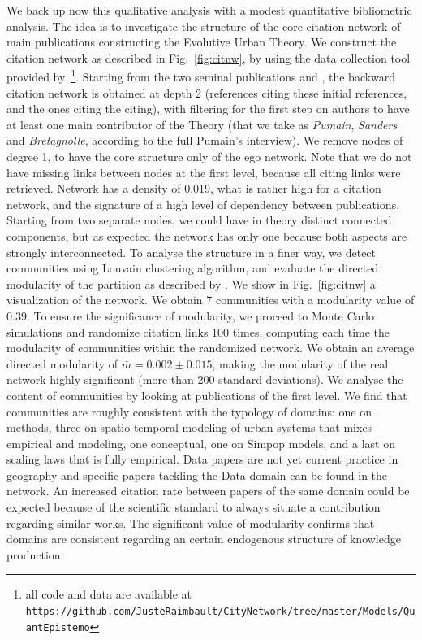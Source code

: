 \documentclass[runningheads,a4paper]{llncs2e/llncs}
\begin{document}
We back up now this qualitative analysis with a modest quantitative bibliometric analysis. The idea is to investigate the structure of the core citation network of main publications constructing the Evolutive Urban Theory. We construct the citation network as described in Fig.~\ref{fig:citnw}, by using the data collection tool provided by~\cite{raimbault2016indirect}\footnote{all code and data are available at \\\texttt{https://github.com/JusteRaimbault/CityNetwork/tree/master/Models/QuantEpistemo}}. Starting from the two seminal publications \cite{pumain1997pour} and \cite{sanders1997simpop}, the backward citation network is obtained at depth 2 (references citing these initial references, and the ones citing the citing), with filtering for the first step on authors to have at least one main contributor of the Theory (that we take as \emph{Pumain}, \emph{Sanders} and \emph{Bretagnolle}, according to the full Pumain's interview). We remove nodes of degree 1, to have the core structure only of the ego network. Note that we do not have missing links between nodes at the first level, because all citing links were retrieved. Network has a density of 0.019, what is rather high for a citation network, and the signature of a high level of dependency between publications. Starting from two separate nodes, we could have in theory distinct connected components, but as expected the network has only one because both aspects are strongly interconnected. To analyse the structure in a finer way, we detect communities using Louvain clustering algorithm, and evaluate the directed modularity of the partition as described by \cite{nicosia2009extending}. We show in Fig.~\ref{fig:citnw} a visualization of the network. We obtain 7 communities with a modularity value of 0.39. To ensure the significance of modularity, we proceed to Monte Carlo simulations and randomize citation links 100 times, computing each time the modularity of communities within the randomized network. We obtain an average directed modularity of $\bar{m} = 0.002 \pm 0.015$, making the modularity of the real network highly significant (more than 200 standard deviations). We analyse the content of communities by looking at publications of the first level. We find that communities are roughly consistent with the typology of domains: one on methods, three on spatio-temporal modeling of urban systems that mixes empirical and modeling, one conceptual, one on Simpop models, and a last on scaling laws that is fully empirical. Data papers are not yet current practice in geography and specific papers tackling the Data domain can be found in the network. An increased citation rate between papers of the same domain could be expected because of the scientific standard to always situate a contribution regarding similar works. The significant value of modularity confirms that domains are consistent regarding an certain endogenous structure of knowledge production.
\end{document}
